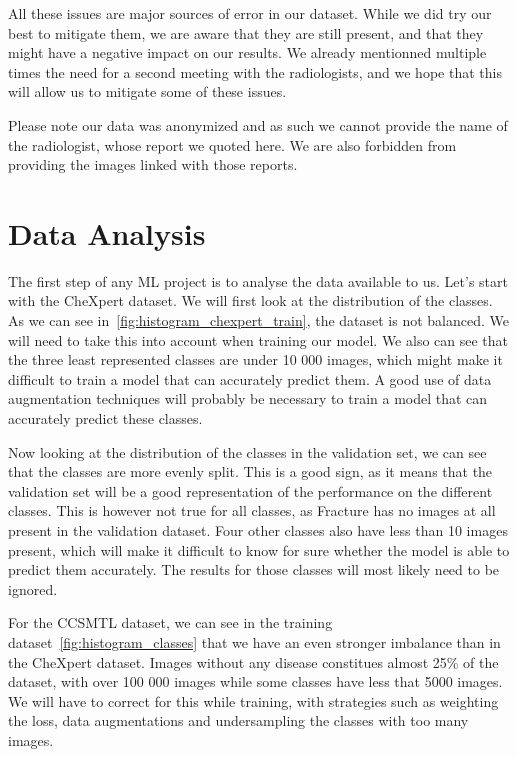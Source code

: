 \documentclass[11pt]{article}
\begin{document}
    All these issues are major sources of error in our dataset. While we did try our best to mitigate them, we are aware that they are still present, and that they might have a negative impact on our results. We already mentionned
    multiple times the need for a second meeting with the radiologists, and we hope that this will allow us to mitigate some of these issues.

    Please note our data was anonymized and as such we cannot provide the name of the radiologist, whose report we quoted here. We are also forbidden from providing the images linked with those reports.

    \section{Data Analysis}

    The first step of any ML project is to analyse the data available to us. Let's start with the CheXpert dataset.
    We will first look at the distribution of the classes. As we can see
    in~\ref{fig:histogram_chexpert_train}, the dataset is not balanced. We will need to take this into account when
    training our model. We also can see that the three least represented classes are under 10 000 images, which might
    make it difficult to train a model that can accurately predict them. A good use of data augmentation techniques
    will probably be necessary to train a model that can accurately predict these classes.

    Now looking at the distribution of the classes in the validation set, we can see that the classes are more evenly
    split. This is a good sign, as it means that the validation set will be a good representation of the performance
    on the different classes. This is however not true for all classes, as Fracture has no images at all present in
    the validation dataset. Four other classes also have less than 10 images present, which will make it difficult to
    know for sure whether the model is able to predict them accurately. The results for those classes will most
    likely need to be ignored.

    For the CCSMTL dataset, we can see in the training dataset~\ref{fig:histogram_classes} that we have an even stronger imbalance than in the
    CheXpert dataset. Images without any disease constitues almost 25\% of the dataset, with over 100 000 images
    while some classes have less that 5000 images. We will have to correct for this while training, with strategies
    such as weighting the loss, data augmentations and undersampling the classes with too many images.
\end{document}

